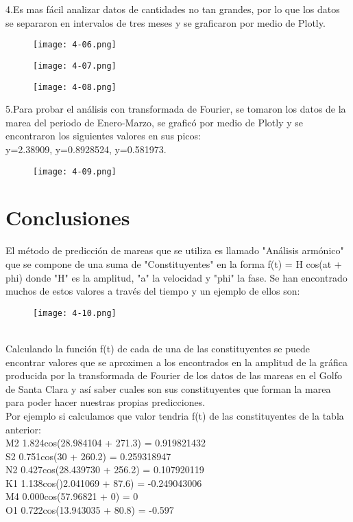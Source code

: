 \documentclass{article}
\begin{document}
4.Es mas fácil analizar datos de cantidades no tan grandes, por lo que los datos se separaron en intervalos de tres meses y se graficaron por medio de Plotly.\\
\begin{figure}[h]
  \texttt{[image: 4-06.png]}
\end{figure}
\clearpage
\begin{figure}[h]
  \texttt{[image: 4-07.png]}
\end{figure}
\begin{figure}[h]
  \texttt{[image: 4-08.png]}
\end{figure}
\clearpage

5.Para probar el análisis con transformada de Fourier, se tomaron los datos de la marea del periodo de Enero-Marzo, se graficó por medio de Plotly y se encontraron los siguientes valores en sus picos:\\ y=2.38909, y=0.8928524, y=0.581973.\\
\begin{figure}[h]
  \texttt{[image: 4-09.png]}
\end{figure}
\clearpage
\section{Conclusiones}
El método de predicción de mareas que se utiliza es llamado "Análisis armónico" que se compone de una suma de "Constituyentes" en la forma  f(t) = H cos(at + phi) donde "H" es la amplitud, "a" la velocidad y "phi" la fase. Se han encontrado muchos de estos valores a través del tiempo y un ejemplo de ellos son:\\
\begin{figure}[h]
  \texttt{[image: 4-10.png]}
\end{figure}
\\
Calculando la función f(t) de cada de una de las constituyentes se puede encontrar valores que se aproximen a los encontrados en la amplitud de la gráfica producida por la transformada de Fourier de los datos de las mareas en el Golfo de Santa Clara y así saber cuales son sus constituyentes que forman la marea para poder hacer nuestras propias predicciones.\\
Por ejemplo si calculamos que valor tendria f(t) de las constituyentes de la tabla anterior:\\
M2   1.824cos(28.984104 + 271.3) = 0.919821432\\
S2   0.751cos(30 + 260.2) = 0.259318947\\
N2   0.427cos(28.439730 + 256.2) = 0.107920119\\
K1   1.138cos()2.041069 + 87.6) = -0.249043006\\
M4   0.000cos(57.96821 + 0) = 0\\
O1   0.722cos(13.943035 + 80.8) = -0.597\\
\end{document}
